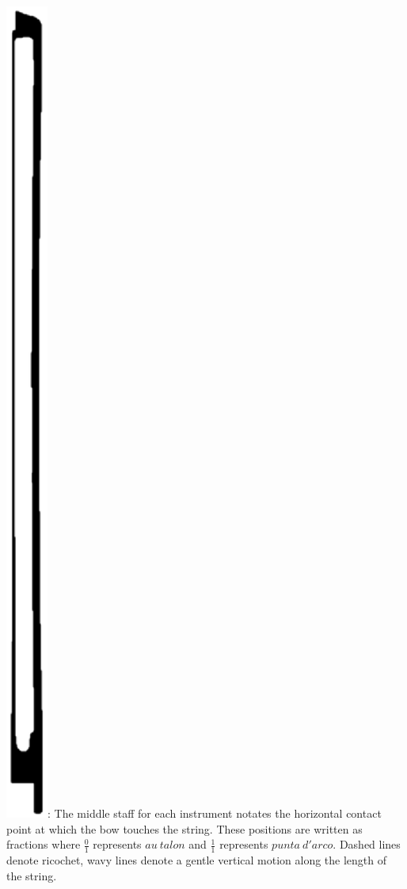 \documentclass[10pt]{article}
\begin{document}
 \includegraphics[height=0.025\textheight]{bow_position_tablature.eps}: The middle staff for each instrument notates the horizontal contact point at which the bow touches the string. These positions are written as fractions where \( \frac{0}{1} \) represents $au \ talon$ and \( \frac{1}{1} \) represents $punta \ d'arco$. Dashed lines denote ricochet, wavy lines denote a gentle vertical motion along the length of the string.
\end{document}
